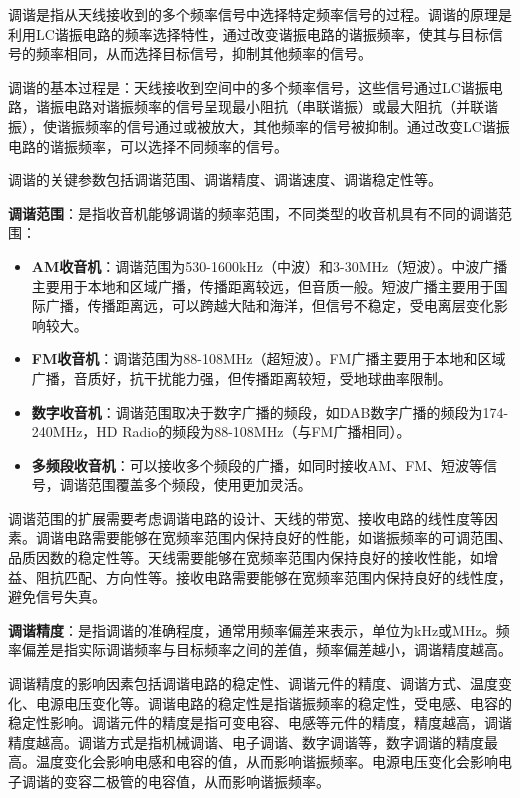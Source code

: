 \documentclass[12pt,UTF8]{ctexbook}
\begin{document}
调谐是指从天线接收到的多个频率信号中选择特定频率信号的过程。调谐的原理是利用LC谐振电路的频率选择特性，通过改变谐振电路的谐振频率，使其与目标信号的频率相同，从而选择目标信号，抑制其他频率的信号。

调谐的基本过程是：天线接收到空间中的多个频率信号，这些信号通过LC谐振电路，谐振电路对谐振频率的信号呈现最小阻抗（串联谐振）或最大阻抗（并联谐振），使谐振频率的信号通过或被放大，其他频率的信号被抑制。通过改变LC谐振电路的谐振频率，可以选择不同频率的信号。

调谐的关键参数包括调谐范围、调谐精度、调谐速度、调谐稳定性等。

\textbf{调谐范围}：是指收音机能够调谐的频率范围，不同类型的收音机具有不同的调谐范围：

\begin{itemize}[leftmargin=3.5em]
    \item \textbf{AM收音机}：调谐范围为530-1600kHz（中波）和3-30MHz（短波）。中波广播主要用于本地和区域广播，传播距离较远，但音质一般。短波广播主要用于国际广播，传播距离远，可以跨越大陆和海洋，但信号不稳定，受电离层变化影响较大。
    \item \textbf{FM收音机}：调谐范围为88-108MHz（超短波）。FM广播主要用于本地和区域广播，音质好，抗干扰能力强，但传播距离较短，受地球曲率限制。
    \item \textbf{数字收音机}：调谐范围取决于数字广播的频段，如DAB数字广播的频段为174-240MHz，HD Radio的频段为88-108MHz（与FM广播相同）。
    \item \textbf{多频段收音机}：可以接收多个频段的广播，如同时接收AM、FM、短波等信号，调谐范围覆盖多个频段，使用更加灵活。
\end{itemize}

调谐范围的扩展需要考虑调谐电路的设计、天线的带宽、接收电路的线性度等因素。调谐电路需要能够在宽频率范围内保持良好的性能，如谐振频率的可调范围、品质因数的稳定性等。天线需要能够在宽频率范围内保持良好的接收性能，如增益、阻抗匹配、方向性等。接收电路需要能够在宽频率范围内保持良好的线性度，避免信号失真。

\textbf{调谐精度}：是指调谐的准确程度，通常用频率偏差来表示，单位为kHz或MHz。频率偏差是指实际调谐频率与目标频率之间的差值，频率偏差越小，调谐精度越高。

调谐精度的影响因素包括调谐电路的稳定性、调谐元件的精度、调谐方式、温度变化、电源电压变化等。调谐电路的稳定性是指谐振频率的稳定性，受电感、电容的稳定性影响。调谐元件的精度是指可变电容、电感等元件的精度，精度越高，调谐精度越高。调谐方式是指机械调谐、电子调谐、数字调谐等，数字调谐的精度最高。温度变化会影响电感和电容的值，从而影响谐振频率。电源电压变化会影响电子调谐的变容二极管的电容值，从而影响谐振频率。
\end{document}

